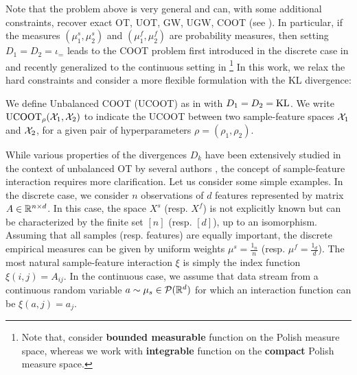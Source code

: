 Note that the problem above is very general and can, with some additional
constraints, recover exact OT, UOT, GW, UGW, COOT (see ).
In particular, if the measures $(\mu^s_1, \mu^s_2)$ and $(\mu^f_1, \mu^f_2)$
are probability measures, then setting $D_1 = D_2 = \iota_=$ leads to the
COOT problem first introduced in the discrete case in \citep{Redko20} and
recently generalized to the continuous setting in \citep{Chowdhury21b}
\footnote{Note that, \citet{Chowdhury21b} consider \textbf{bounded measurable} function
on the Polish measure space, whereas we work with \textbf{integrable} function
on the \textbf{compact} Polish measure space.}
In this work, we relax the hard constraints and consider a more flexible formulation
with the KL divergence:
\begin{definition}[UCOOT]
   We define Unbalanced COOT (UCOOT) as in  with $D_1 = D_2 = \text{KL}$.
   We write $\text{UCOOT}_{\rho}(\mathcal X_1, \mathcal X_2)$ to indicate the UCOOT between
   two sample-feature spaces $\mathcal X_1$ and $\mathcal X_2$, for a given
   pair of hyperparameters $\rho = (\rho_1, \rho_2)$.
\end{definition}
While various properties of the divergences $D_k$ have been extensively studied
in the context of unbalanced OT by several authors \citep{Chizat17,Frogner15},
the concept of sample-feature interaction requires more clarification.
Let us consider some simple examples.
In the discrete case, we consider $n$ observations of $d$ features
represented by matrix $A \in \mathbb R^{n \times d}$. In this case, the space $X^s$ (resp. $X^f$)
is not explicitly known but can be characterized by the finite set $[n]$ (resp. $[d]$),
up to an isomorphism. Assuming that all samples (resp. features) are equally important,
the discrete empirical measures can be given by uniform weights $\mu^s = \frac{1_{n}}{n}$
(resp. $\mu^f = \frac{1_{d}}{d}$). The most natural sample-feature interaction $\xi$ is simply
the index function $\xi(i, j) = A_{ij}$. In the continuous case,
we assume that data stream from a continuous random variable $a \sim \mu_s \in \mathcal P(\mathbb R^d)$
for which an interaction function can be $\xi(a, j) = a_j$.
